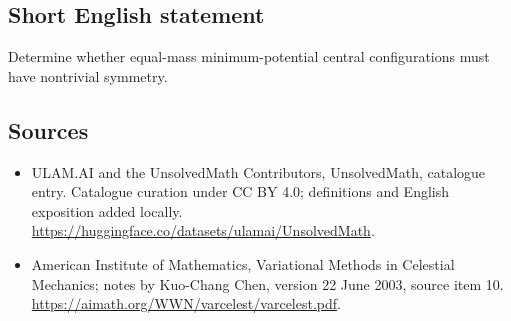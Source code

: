 \documentclass[11pt]{article}
\begin{document}
\subsection{Short English statement}
Determine whether equal-mass minimum-potential central configurations must have nontrivial symmetry.
\subsection{Sources}
\begin{itemize}
\item[\hypertarget{source:statement:1}{S1}] ULAM.AI and the UnsolvedMath Contributors, UnsolvedMath, catalogue entry. Catalogue curation under CC BY 4.0; definitions and English exposition added locally.
\url{https://huggingface.co/datasets/ulamai/UnsolvedMath}.
\item[\hypertarget{source:statement:2}{S2}] American Institute of Mathematics, Variational Methods in Celestial Mechanics; notes by Kuo-Chang Chen, version 22 June 2003, source item 10.
\url{https://aimath.org/WWN/varcelest/varcelest.pdf}.
\end{itemize}
\label{end:statement}
\end{document}
